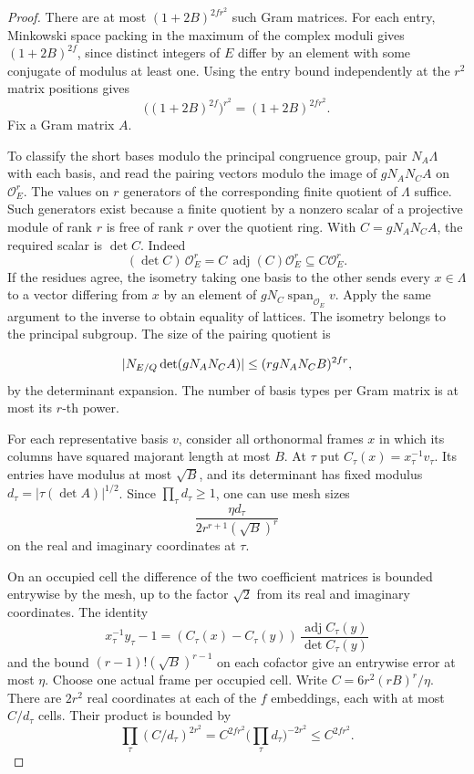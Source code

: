 \begin{proof}
There are at most \((1+2B)^{2fr^2}\) such Gram matrices.
For each entry, Minkowski space packing in the maximum of the
complex moduli gives \((1+2B)^{2f}\), since distinct integers
of \(E\) differ by an element with some conjugate of modulus
at least one.
Using the entry bound independently at the \(r^2\) matrix positions gives
\[
  \big((1+2B)^{2f}\big)^{r^2}=(1+2B)^{2fr^2}.
\]
 Fix a Gram matrix \(A\).

To classify the
short bases modulo the principal congruence group, pair
\(N_A\Lambda\) with each basis, and read the pairing vectors
modulo the image of \(gN_AN_CA\) on \(\mathcal O_E^r\).
The values on \(r\) generators of the corresponding finite
quotient of \(\Lambda\) suffice. Such generators exist because
a finite quotient by a nonzero scalar of a projective module
of rank \(r\) is free of rank \(r\) over the quotient ring.
With \(C=gN_AN_CA\), the required scalar is \(\det C\). Indeed
\[
 (\det C)\,\mathcal O_E^r
 =C\,\operatorname{adj}(C)\mathcal O_E^r\subseteq C\mathcal O_E^r .
\]
If the residues agree, the isometry taking one basis to
the other sends every \(x\in\Lambda\) to a vector differing
from \(x\) by an element of \(gN_C\operatorname{span}_{\mathcal O_E}v\).
Apply the same argument to the inverse to obtain equality of
lattices. The isometry belongs to the principal subgroup.
The size of the pairing quotient is

\[
  |N_{E/Q}\det(gN_AN_CA)|\le(rgN_AN_CB)^{2fr},
\]
by the determinant expansion. The number of basis types per
Gram matrix is at most its \(r\)-th power.

For each representative basis \(v\), consider all orthonormal
frames \(x\) in which its columns have squared majorant length
at most \(B\). At \(\tau\) put \(C_\tau(x)=x_\tau^{-1}v_\tau\).
Its entries have modulus at most \(\sqrt B\), and its
determinant has fixed modulus
\(d_\tau=|\tau(\det A)|^{1/2}\).
Since \(\prod_\tau d_\tau\ge1\), one can use mesh sizes
\[
 \frac{\eta d_\tau}{2r^{r+1}(\sqrt B)^r}
\]
on the real and imaginary coordinates at \(\tau\).

On an occupied cell the difference of the two coefficient
matrices is bounded entrywise by the mesh, up to the factor
\(\sqrt2\) from its real and imaginary coordinates. The identity
\[
 x_\tau^{-1}y_\tau-1
   =(C_\tau(x)-C_\tau(y))\,
        \frac{\operatorname{adj}C_\tau(y)}{\det C_\tau(y)}
\]
and the bound \((r-1)!(\sqrt B)^{r-1}\) on each cofactor
give an entrywise error at most \(\eta\). Choose one
actual frame per occupied cell. Write \(C=6r^2(rB)^r/\eta\). There are \(2r^2\) real coordinates at
each of the \(f\) embeddings, each with at most \(C/d_\tau\) cells.
Their product is bounded by
\[
 \prod_\tau (C/d_\tau)^{2r^2}
 = C^{2fr^2}\bigl(\prod_\tau d_\tau\bigr)^{-2r^2}
 \le C^{2fr^2}.
\]


\end{proof}
